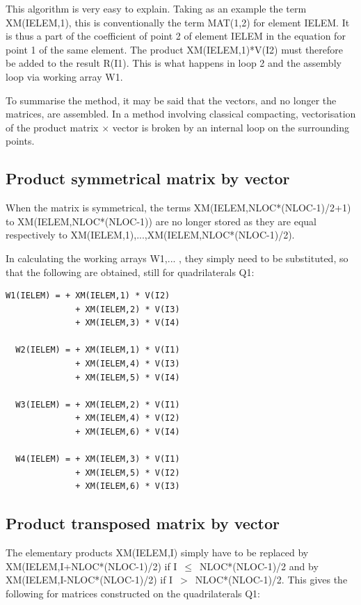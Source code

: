 This algorithm is very easy to explain. Taking as an example the term
XM(IELEM,1), this is conventionally the term MAT(1,2) for element IELEM. It is
thus a part of the coefficient of point 2 of element IELEM in the equation for
point 1 of the same element. The product XM(IELEM,1)*V(I2) must therefore be
added to the result R(I1). This is what happens in loop 2 and the assembly loop
via working array W1.

To summarise the method, it may be said that the vectors, and no longer the
matrices, are assembled. In a method involving classical compacting,
vectorisation of the product matrix $\times$ vector is broken by an internal loop on
the surrounding points.

\subsection{Product symmetrical matrix by vector}

When the matrix is symmetrical, the terms XM(IELEM,NLOC*(NLOC-1)/2+1) to
XM(IELEM,NLOC*(NLOC-1)) are no longer stored as they are equal respectively to
XM(IELEM,1),...,XM(IELEM,NLOC*(NLOC-1)/2).

In calculating the working arrays W1,... , they simply need to be substituted,
so that the following are obtained, still for quadrilaterals Q1:
\begin{lstlisting}[language=TelFortran]
  W1(IELEM) = + XM(IELEM,1) * V(I2)
              + XM(IELEM,2) * V(I3)
              + XM(IELEM,3) * V(I4)

  W2(IELEM) = + XM(IELEM,1) * V(I1)
              + XM(IELEM,4) * V(I3)
              + XM(IELEM,5) * V(I4)

  W3(IELEM) = + XM(IELEM,2) * V(I1)
              + XM(IELEM,4) * V(I2)
              + XM(IELEM,6) * V(I4)

  W4(IELEM) = + XM(IELEM,3) * V(I1)
              + XM(IELEM,5) * V(I2)
              + XM(IELEM,6) * V(I3)
\end{lstlisting}

\subsection{Product transposed matrix by vector}

The elementary products XM(IELEM,I) simply have to be replaced by
XM(IELEM,I+NLOC*(NLOC-1)/2) if I~$\mathrm{\le}$~NLOC*(NLOC-1)/2 and by
XM(IELEM,I-NLOC*(NLOC-1)/2) if I~$>$~NLOC*(NLOC-1)/2. This gives the following
for matrices constructed on the quadrilaterals Q1:

